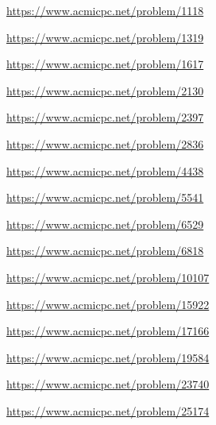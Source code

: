\begin{problem} \url{https://www.acmicpc.net/problem/1118} \end{problem}
\begin{problem} \url{https://www.acmicpc.net/problem/1319} \end{problem}
\begin{problem} \url{https://www.acmicpc.net/problem/1617} \end{problem}
\begin{problem} \url{https://www.acmicpc.net/problem/2130} \end{problem}
\begin{problem} \url{https://www.acmicpc.net/problem/2397} \end{problem}
\begin{problem} \url{https://www.acmicpc.net/problem/2836} \end{problem}
\begin{problem} \url{https://www.acmicpc.net/problem/4438} \end{problem}
\begin{problem} \url{https://www.acmicpc.net/problem/5541} \end{problem}
\begin{problem} \url{https://www.acmicpc.net/problem/6529} \end{problem}
\begin{problem} \url{https://www.acmicpc.net/problem/6818} \end{problem}
\begin{problem} \url{https://www.acmicpc.net/problem/10107} \end{problem}
\begin{problem} \url{https://www.acmicpc.net/problem/15922} \end{problem}
\begin{problem} \url{https://www.acmicpc.net/problem/17166} \end{problem}
\begin{problem} \url{https://www.acmicpc.net/problem/19584} \end{problem}
\begin{problem} \url{https://www.acmicpc.net/problem/23740} \end{problem}
\begin{problem} \url{https://www.acmicpc.net/problem/25174} \end{problem}

